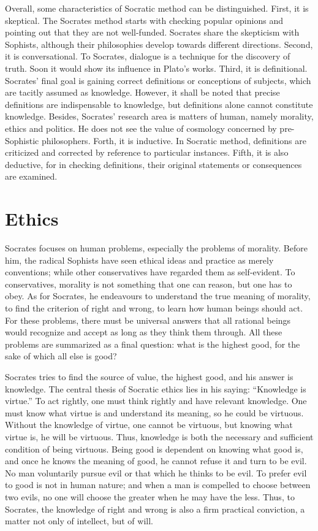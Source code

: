 \documentclass[11pt]{article}
\begin{document}
\begin{sloppypar}
Overall, some characteristics of Socratic method can be distinguished. 
First, it is skeptical. 
The Socrates method starts with checking popular opinions and pointing out that they are not well-funded. 
Socrates share the skepticism with Sophists, although their philosophies develop towards different directions. 
Second, it is conversational. 
To Socrates, dialogue is a technique for the discovery of truth. 
Soon it would show its influence in Plato’s works. 
Third, it is definitional. 
Socrates’ final goal is gaining correct definitions or conceptions of subjects, which are tacitly assumed as knowledge. 
However, it shall be noted that precise definitions are indispensable to knowledge, but definitions alone cannot constitute knowledge. 
Besides, Socrates’ research area is matters of human, namely morality, ethics and politics. 
He does not see the value of cosmology concerned by pre-Sophistic philosophers. 
Forth, it is inductive. 
In Socratic method, definitions are criticized and corrected by reference to particular instances. 
Fifth, it is also deductive, for in checking definitions, their original statements or consequences are examined.
  
\section{Ethics} 
Socrates focuses on human problems, especially the problems of morality. 
Before him, the radical Sophists have seen ethical ideas and practice as merely conventions; while other conservatives have regarded them as self-evident. 
To conservatives, morality is not something that one can reason, but one has to obey. 
As for Socrates, he endeavours to understand the true meaning of morality, to find the criterion of right and wrong, to learn how human beings should act. 
For these problems, there must be universal answers that all rational beings would recognize and accept as long as they think them through. 
All these problems are summarized as a final question: what is the highest good, for the sake of which all else is good?

\par

Socrates tries to find the source of value, the highest good, and his answer is knowledge. 
The central thesis of Socratic ethics lies in his saying: 
“Knowledge is virtue.” 
To act rightly, one must think rightly and have relevant knowledge. 
One must know what virtue is and understand its meaning, so he could be virtuous. 
Without the knowledge of virtue, one cannot be virtuous, but knowing what virtue is, he will be virtuous. 
Thus, knowledge is both the necessary and sufficient condition of being virtuous. 
Being good is dependent on knowing what good is, and once he knows the meaning of good, he cannot refuse it and turn to be evil. 
No man voluntarily pursue evil or that which he thinks to be evil. 
To prefer evil to good is not in human nature; 
and when a man is compelled to choose between two evils, no one will choose the greater when he may have the less.
Thus, to Socrates, the knowledge of right and wrong is also a firm practical conviction, a matter not only of intellect, but of will.


\end{sloppypar}
\end{document}
